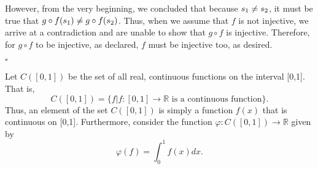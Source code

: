 \documentclass[12pt]{exam}
\begin{document}
\begin{questions}
\par 
However, from the very beginning, we concluded that because $s\textsubscript{1} \neq s\textsubscript{2}$, it must be true that $g \circ f(s\textsubscript{1}) \neq g \circ f(s\textsubscript{2})$. Thus, when we assume that $f$ is not injective, we arrive at a contradiction and are unable to show that $g \circ f$ is injective. Therefore, for $g \circ f$ to be injective, as declared, $f$ must be injective too, as desired.
\begin{flushright}
$\square$
\end{flushright}

\question Let $C([0,1])$ be the set of all real, continuous functions on the interval [0,1]. That is,
\begin{equation*}
C([0,1]) = \{f | f:[0,1] \rightarrow \mathbb{R} \text{ is a continuous function} \}.
\end{equation*}
Thus, an element of the set $C([0,1])$ is simply a function $f(x)$ that is continuous on [0,1]. Furthermore, consider the function $\varphi : C([0,1]) \rightarrow \mathbb{R}$ given by
\begin{equation*}
\varphi (f) = \int_{0}^{1} f(x)dx.
\end{equation*}
\begin{parts}

\end{parts}
\end{questions}
\end{document}
